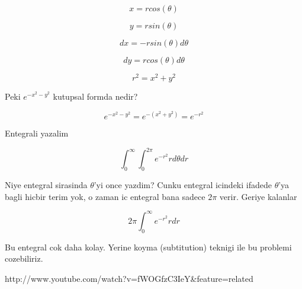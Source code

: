 \documentclass[12pt,fleqn]{article}
\begin{document}
\[ x = rcos(\theta) \]

\[ y = rsin(\theta) \]

\[ dx = -rsin(\theta)d\theta \]

\[ dy = rcos(\theta)d\theta \]

\[ r^2 = x^2 + y^2 \]

Peki $e^{-x^2-y^2}$ kutupsal formda nedir? 

\[ e^{-x^2-y^2} = e^{-(x^2+y^2)} = e^{-r^2} \]

Entegrali yazalim

\[ \int_{0}^{\infty} \int_{0}^{2\pi} e^{-r^2} r d\theta dr \]

Niye entegral sirasinda $\theta$'yi once yazdim? Cunku entegral icindeki
ifadede $\theta$'ya bagli hicbir terim yok, o zaman ic entegral bana sadece
$2\pi$ verir. Geriye kalanlar

\[ 2\pi \int_{0}^{\infty} e^{-r^2} r dr \]

Bu entegral cok daha kolay. Yerine koyma (subtitution) teknigi ile bu
problemi cozebiliriz. 






http://www.youtube.com/watch?v=fWOGfzC3IeY\&feature=related
\end{document}
